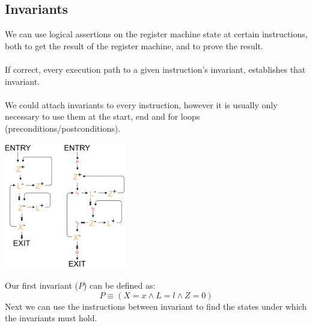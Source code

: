 \subsection{Invariants}
We can use logical assertions on the register machine state at certain instructions, both to get the result of the register machine, and to prove the result.
\\
\\ If correct, every execution path to a given instruction's invariant, establishes that invariant.
\\
\\ We could attach invariants to every instruction, however it is usually only necessary to use them at the start, end and for loops (preconditions/postconditions).
\begin{center}
    \includegraphics[width=0.4\textwidth]{register_machines/images/rm_analysis_invariants.drawio.png}
\end{center}
Our first invariant ($P$) can be defined as:
\[P \equiv (X =x  \land L = l \land Z = 0)\]
Next we can use the instructions between invariant to find the states under which the invariants must hold.
